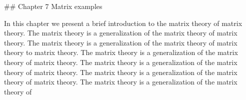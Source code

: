 

## Chapter 7 Matrix examples

In this chapter we present a brief introduction to the matrix theory of matrix theory. The matrix theory is a generalization of the matrix theory of matrix theory. The matrix theory is a generalization of the matrix theory of matrix theory to matrix theory. The matrix theory is a generalization of the matrix theory of matrix theory. The matrix theory is a generalization of the matrix theory of matrix theory. The matrix theory is a generalization of the matrix theory of matrix theory. The matrix theory is a generalization of the matrix theory of